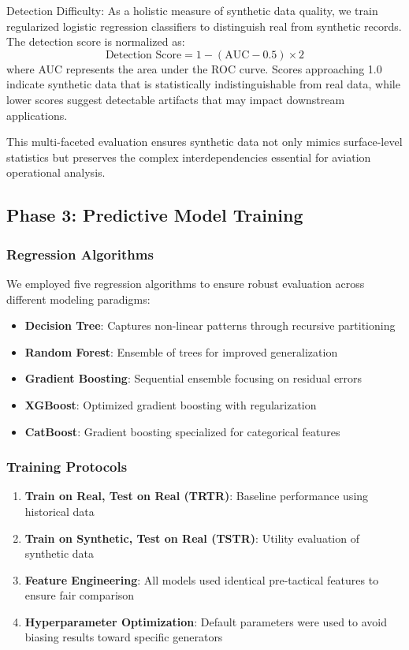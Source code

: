 \documentclass[conference]{IEEEtran}
\begin{document}
Detection Difficulty:
As a holistic measure of synthetic data quality, we train regularized logistic regression classifiers to distinguish real from synthetic records. The detection score is normalized as:
\begin{equation}
\text{Detection Score} = 1 - (\text{AUC} - 0.5) \times 2
\end{equation}
where AUC represents the area under the ROC curve. Scores approaching 1.0 indicate synthetic data that is statistically indistinguishable from real data, while lower scores suggest detectable artifacts that may impact downstream applications.

This multi-faceted evaluation ensures synthetic data not only mimics surface-level statistics but preserves the complex interdependencies essential for aviation operational analysis.


\subsection{Phase 3: Predictive Model Training}

\subsubsection{Regression Algorithms}
We employed five regression algorithms to ensure robust evaluation across different modeling paradigms:
\begin{itemize}
    \item \textbf{Decision Tree}: Captures non-linear patterns through recursive partitioning
    \item \textbf{Random Forest}: Ensemble of trees for improved generalization
    \item \textbf{Gradient Boosting}: Sequential ensemble focusing on residual errors
    \item \textbf{XGBoost}: Optimized gradient boosting with regularization
    \item \textbf{CatBoost}: Gradient boosting specialized for categorical features
\end{itemize}

\subsubsection{Training Protocols}
\begin{enumerate}
    \item \textbf{Train on Real, Test on Real (TRTR)}: Baseline performance using historical data
    \item \textbf{Train on Synthetic, Test on Real (TSTR)}: Utility evaluation of synthetic data
    \item \textbf{Feature Engineering}: All models used identical pre-tactical features to ensure fair comparison
    \item \textbf{Hyperparameter Optimization}: Default parameters were used to avoid biasing results toward specific generators
\end{enumerate}
\end{document}
